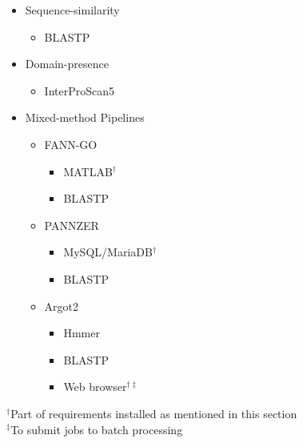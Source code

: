 \begin{itemize}
    \item Sequence-similarity
        \begin{itemize}
            \item BLASTP
        \end{itemize}
    \item Domain-presence
        \begin{itemize}
            \item InterProScan5
        \end{itemize}
    \item Mixed-method Pipelines
    \begin{itemize}
        \item FANN-GO
        \begin{itemize}
            \item MATLAB$^\dagger$  
            \item BLASTP
        \end{itemize}
        \item PANNZER
        \begin{itemize}
            \item MySQL/MariaDB$^\dagger$
            \item BLASTP
        \end{itemize}
        \item Argot2
        \begin{itemize}
            \item Hmmer
            \item BLASTP
            \item Web browser$^{\dagger\ddagger}$
        \end{itemize}
    \end{itemize}
\end{itemize}

\noindent
    $^\dagger$Part of requirements installed as mentioned in this section \\
    $^\ddagger$To submit jobs to batch processing